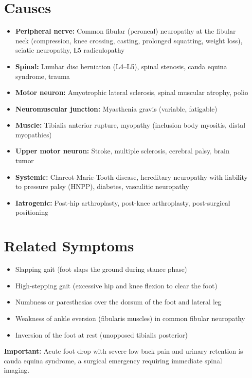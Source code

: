 \section*{Causes}
\begin{itemize}
  \item \textbf{Peripheral nerve:} Common fibular (peroneal) neuropathy at the fibular neck (compression, knee crossing, casting, prolonged squatting, weight loss), sciatic neuropathy, L5 radiculopathy
  \item \textbf{Spinal:} Lumbar disc herniation (L4--L5), spinal stenosis, cauda equina syndrome, trauma
  \item \textbf{Motor neuron:} Amyotrophic lateral sclerosis, spinal muscular atrophy, polio
  \item \textbf{Neuromuscular junction:} Myasthenia gravis (variable, fatigable)
  \item \textbf{Muscle:} Tibialis anterior rupture, myopathy (inclusion body myositis, distal myopathies)
  \item \textbf{Upper motor neuron:} Stroke, multiple sclerosis, cerebral palsy, brain tumor
  \item \textbf{Systemic:} Charcot-Marie-Tooth disease, hereditary neuropathy with liability to pressure palsy (HNPP), diabetes, vasculitic neuropathy
  \item \textbf{Iatrogenic:} Post-hip arthroplasty, post-knee arthroplasty, post-surgical positioning
\end{itemize}

\section*{Related Symptoms}
\begin{itemize}
  \item Slapping gait (foot slaps the ground during stance phase)
  \item High-stepping gait (excessive hip and knee flexion to clear the foot)
  \item Numbness or paresthesias over the dorsum of the foot and lateral leg
  \item Weakness of ankle eversion (fibularis muscles) in common fibular neuropathy
  \item Inversion of the foot at rest (unopposed tibialis posterior)
\end{itemize}
\textbf{Important:} Acute foot drop with severe low back pain and urinary retention is cauda equina syndrome, a surgical emergency requiring immediate spinal imaging.

